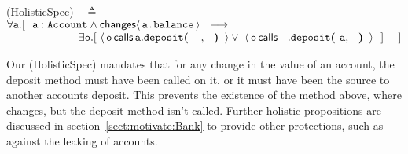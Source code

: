   \vspace{.01in}
(HolisticSpec)\ \  $\triangleq$\\ 
$\forall \prg{a}.[\ \ \prg{a}:\prg{Account} \wedge \Changes{\prg{a.balance}}  \ \    
    \longrightarrow \ \    \hfill$ \\
  $\strut \hspace{2.3cm} 
  \exists \prg{o}. [\    \Calls{\prg{o}}{\prg{deposit}}{\prg{a}}{\_,\_} \vee\  \Calls{\prg{o}}{\prg{deposit}}{\_}{\prg{a},\_}\  \ ] \ \ \ \ ] \hfill $
\vspace{.05in}



Our (HolisticSpec) mandates that for any change in the value of an account, the deposit method must have been called on it, or it must have been the source to another accounts deposit. This prevents the existence of the  method above, where  changes, but the deposit method isn't called. Further holistic propositions are discussed in section~\ref{sect:motivate:Bank} to provide other protections, such as against the leaking of accounts.
% 
%
\vspace{.02in}
%
% 

